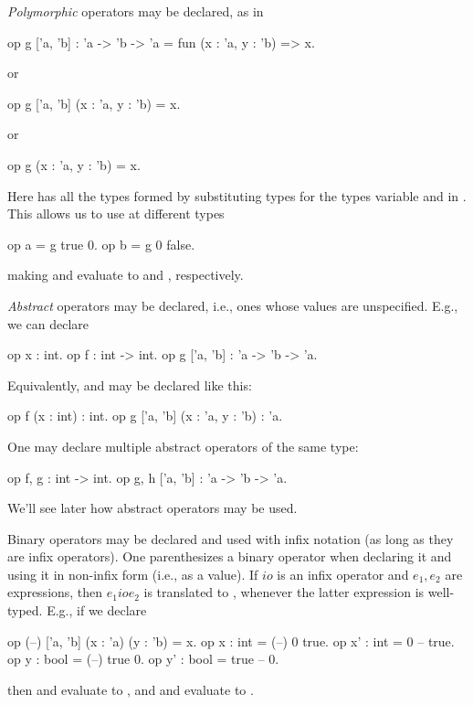 \emph{Polymorphic} operators may be declared, as in
\begin{easycrypt}{}{}
op g ['a, 'b] : 'a -> 'b -> 'a = fun (x : 'a, y : 'b) => x.
\end{easycrypt}
or
\begin{easycrypt}{}{}
op g ['a, 'b] (x : 'a, y : 'b) = x.
\end{easycrypt}
or
\begin{easycrypt}{}{}
op g (x : 'a, y : 'b) = x.
\end{easycrypt}
Here  has all the types formed
by substituting types for the types variable  and 
in . This allows us to use  at different
types
\begin{easycrypt}{}{}
op a = g true 0.
op b = g 0 false.
\end{easycrypt}
making  and  evaluate to  and , respectively.

\emph{Abstract} operators may be declared, i.e., ones whose values
are unspecified. E.g., we can declare
\begin{easycrypt}{}{}
op x : int.
op f : int -> int.
op g ['a, 'b] : 'a -> 'b -> 'a.
\end{easycrypt}
Equivalently,  and  may be declared like this:
\begin{easycrypt}{}{}
op f (x : int) : int.
op g ['a, 'b] (x : 'a, y : 'b) : 'a.
\end{easycrypt}
One may declare multiple abstract operators of the same type:
\begin{easycrypt}{}{}
op f, g : int -> int.
op g, h ['a, 'b] : 'a -> 'b -> 'a.
\end{easycrypt}
We'll see later how abstract operators may be used.

Binary operators may be declared and used with infix notation (as long
as they are infix operators). One parenthesizes a binary operator when
declaring it and using it in non-infix form (i.e., as a value).  If
$\mathit{io}$ is an infix operator and $e_1,e_2$ are expressions, then
$e_1\mathbin{\mathit{io}}e_2$ is translated to , whenever the latter expression is
well-typed. E.g., if we declare
\begin{easycrypt}{}{}
op (--) ['a, 'b] (x : 'a) (y : 'b) = x.
op x : int = (--) 0 true.
op x' : int = 0 -- true.
op y : bool = (--) true 0.
op y' : bool = true -- 0.
\end{easycrypt}
then  and  evaluate to , and
 and  evaluate to .


